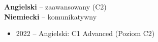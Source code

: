 \documentclass[9pt]{developercv} %
\begin{document}
\begin{minipage}[t]{0.3\textwidth}
	\vspace{-\baselineskip} %

	
    \textbf{Angielski} -- zaawansowany (C2)\\
	\textbf{Niemiecki} -- komunikatywny
\end{minipage}
\hfill
\begin{minipage}[t]{0.3\textwidth}
	\vspace{-\baselineskip} %
	
	
	\lorem
\end{minipage}
\hfill
\begin{minipage}[t]{0.35\textwidth}
	\vspace{-\baselineskip} %
	\begin{itemize}
        \vspace{-\baselineskip} %
	    \item 2022 -- Angielski: C1 Advanced (Poziom C2)
	\end{itemize}
\end{minipage}

\end{document}

